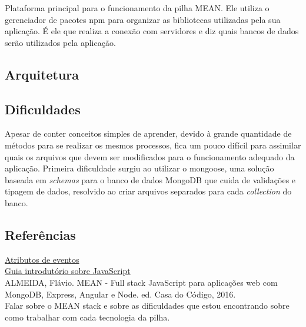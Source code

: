 \documentclass[a4paper, 12pt]{article}
\begin{document}
Plataforma principal para o funcionamento da pilha MEAN. Ele utiliza o gerenciador de pacotes npm para organizar as bibliotecas utilizadas pela sua aplicação. É ele que realiza a conexão com servidores e diz quais bancos de dados serão utilizados pela aplicação.


\subsection{Arquitetura}


\subsection{Dificuldades}

Apesar de conter conceitos simples de aprender, devido à grande quantidade de métodos para se realizar os mesmos processos, fica um pouco difícil para assimilar quais os arquivos que devem ser modificados para o funcionamento adequado da aplicação.
Primeira dificuldade surgiu ao utilizar o mongoose, uma solução baseada em \textit{schemas} para o banco de dados MongoDB que cuida de validações e tipagem de dados, resolvido ao criar arquivos separados para cada \textit{collection} do banco.


\subsection{Referências}

\href{https://www.w3schools.com/tags/ref_eventattributes.asp}{Atributos de eventos}\\
\href{http://tableless.github.io/iniciantes/manual/js/}{Guia introdutório sobre JavaScript}\\

ALMEIDA, Flávio. MEAN - Full stack JavaScript para aplicações web com MongoDB, Express, Angular e Node. ed. Casa do Código, 2016.\\

Falar sobre o MEAN stack e sobre as dificuldades que estou encontrando sobre como trabalhar com cada tecnologia da pilha.
\end{document}
